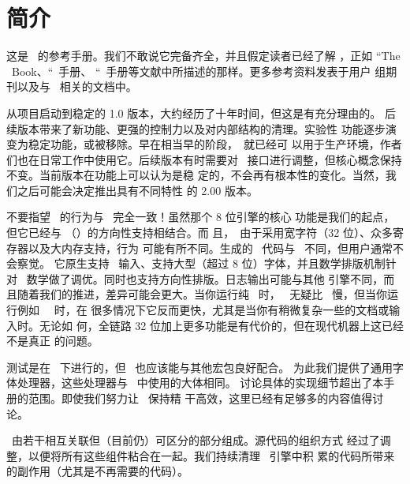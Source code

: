 \chapter{简介}

这是 \LUATEX\ 的参考手册。我们不敢说它完备齐全，并且假定读者已经了解
\TEX{}，正如 ``The \TEX\ Book、``\ETEX\ 手册、
``\PDFTEX\ 手册等文献中所描述的那样。更多参考资料发表于用户
组期刊以及与 \CONTEXT\ 相关的文档中。

从项目启动到稳定的 1.0 版本，大约经历了十年时间，但这是有充分理由的。
后续版本带来了新功能、更强的控制力以及对内部结构的清理。实验性
功能逐步演变为稳定功能，或被移除。早在相当早的阶段，\LUATEX\ 就已经可
以用于生产环境，作者们也在日常工作中使用它。后续版本有时需要对
\LUA\ 接口进行调整，但核心概念保持不变。当前版本在功能上可以认为是稳
定的，不会再有根本性的变化。当然，我们之后可能会决定推出具有不同特性
的 2.00 版本。

不要指望 \LUATEX\ 的行为与 \PDFTEX\ 完全一致！虽然那个 8 位引擎的核心
功能是我们的起点，但它已经与 \OMEGA{}（\ALEPH）的方向性支持相结合。而
且，\LUATEX\ 由于采用宽字符（32 位）、众多寄存器以及大内存支持，行为
可能有所不同。生成的 \PDF\ 代码与 \PDFTEX\ 不同，但用户通常不会察觉。
它原生支持 \UTF\ 输入、支持大型（超过 8 位）字体，并且数学排版机制针
对 \OPENTYPE\ 数学做了调优。同时也支持方向性排版。日志输出可能与其他
引擎不同，而且随着我们的推进，差异可能会更大。当你运行纯 \TEX\ 时，
\LUATEX\ 无疑比 \PDFTEX\ 慢，但当你运行例如 \CONTEXT\ \MKIV\ 时，在
很多情况下它反而更快，尤其是当你有稍微复杂一些的文档或输入时。无论如
何，全链路 32 位加上更多功能是有代价的，但在现代机器上这已经不是真正
的问题。

测试是在 \CONTEXT\ 下进行的，但 \LUATEX\ 也应该能与其他宏包良好配合。
为此我们提供了通用字体处理器，这些处理器与 \CONTEXT\ 中使用的大体相同。
讨论具体的实现细节超出了本手册的范围。即使我们努力让 \LUATEX\ 保持精
干高效，这里已经有足够多的内容值得讨论。

\LUATEX\ 由若干相互关联但（目前仍）可区分的部分组成。源代码的组织方式
经过了调整，以便将所有这些组件粘合在一起。我们持续清理 \TEX\ 引擎中积
累的代码所带来的副作用（尤其是不再需要的代码）。

